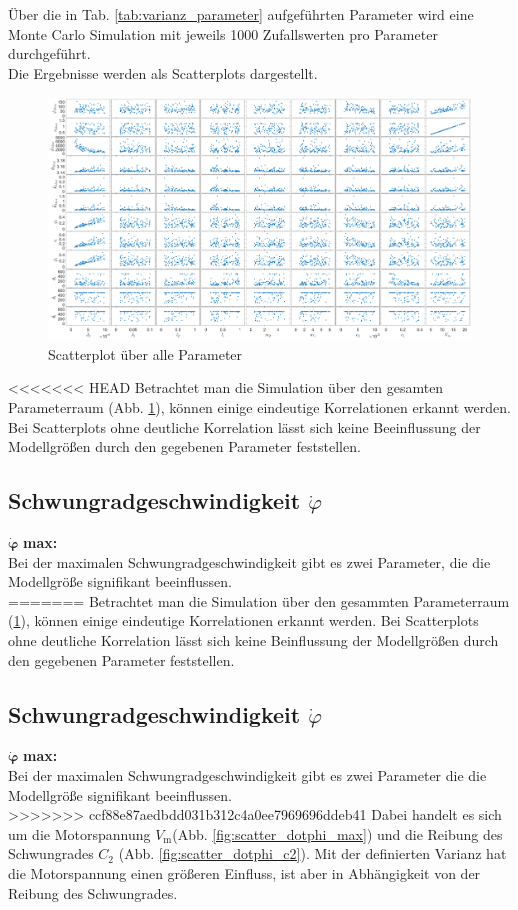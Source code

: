 Über die in Tab. \ref{tab:varianz_parameter} aufgeführten Parameter wird eine Monte Carlo Simulation mit jeweils 1000 Zufallswerten pro Parameter durchgeführt.\\
Die Ergebnisse werden als Scatterplots dargestellt.\\

\begin{figure}
    \centering
    \includegraphics[width=\textwidth]{Bilder/5_sensi/cm/scatter.eps}
    \caption{Scatterplot über alle Parameter}
    \label{fig:scatter}
\end{figure}
<<<<<<< HEAD
Betrachtet man die Simulation über den gesamten Parameterraum (Abb. \ref{fig:scatter}), können einige eindeutige Korrelationen erkannt werden.
Bei Scatterplots ohne deutliche Korrelation lässt sich keine Beeinflussung der Modellgrößen durch den gegebenen Parameter feststellen.

\subsection*{Schwungradgeschwindigkeit $\dot\varphi$}
$\bm{\dot\varphi}$ \textbf{max: }\\
Bei der maximalen Schwungradgeschwindigkeit gibt es zwei Parameter, die die Modellgröße signifikant beeinflussen.\\
=======
Betrachtet man die Simulation über den gesammten Parameterraum (\ref{fig:scatter}), können einige eindeutige Korrelationen erkannt werden.
Bei Scatterplots ohne deutliche Korrelation lässt sich keine Beinflussung der Modellgrößen durch den gegebenen Parameter feststellen.

\subsection*{Schwungradgeschwindigkeit $\dot\varphi$}
$\bm{\dot\varphi}$ \textbf{max: }\\
Bei der maximalen Schwungradgeschwindigkeit gibt es zwei Parameter die die Modellgröße signifikant beeinflussen.\\
>>>>>>> ccf88e87aedbdd031b312c4a0ee7969696ddeb41
Dabei handelt es sich um die Motorspannung $V_{\mathrm{m}}$(Abb. \ref{fig:scatter_dotphi_max}) und die Reibung des Schwungrades $C_2$ (Abb. \ref{fig:scatter_dotphi_c2}).
Mit der definierten Varianz hat die Motorspannung einen größeren Einfluss, ist aber in Abhängigkeit von der Reibung des Schwungrades.\\

